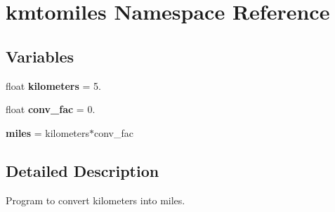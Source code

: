 \hypertarget{namespacekmtomiles}{}\section{kmtomiles Namespace Reference}
\label{namespacekmtomiles}
\subsection*{Variables}
\begin{DoxyCompactItemize}
\item 
float {\bfseries kilometers} = 5.\hypertarget{namespacekmtomiles_a4900af15c43b25824793eeca339e0464}{}\label{namespacekmtomiles_a4900af15c43b25824793eeca339e0464}

\item 
float {\bfseries conv\+\_\+fac} = 0.\hypertarget{namespacekmtomiles_ac819fa2e0ab179268444436a6e0f21c0}{}\label{namespacekmtomiles_ac819fa2e0ab179268444436a6e0f21c0}

\item 
{\bfseries miles} = kilometers$\ast$conv\+\_\+fac\hypertarget{namespacekmtomiles_afc76b0a22b4e49a0c3b414e04141af68}{}\label{namespacekmtomiles_afc76b0a22b4e49a0c3b414e04141af68}

\end{DoxyCompactItemize}


\subsection{Detailed Description}
\begin{DoxyVerb}Program to convert kilometers into miles. \end{DoxyVerb}
 